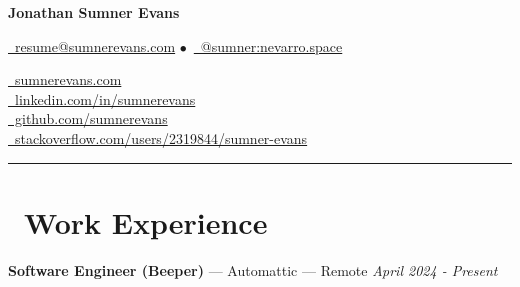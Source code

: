\documentclass[10pt,letterpaper]{article}
\begin{document}
\begin{minipage}[b][][b]{0.5\linewidth}
    {\huge\textbf{Jonathan Sumner Evans}}

    \vspace{5pt}
    \href{mailto:resume@sumnerevans.com}{\faEnvelope\ resume@sumnerevans.com}
    $\bullet$\ \href{https://matrix.to/#/@sumner:nevarro.space}{\faMatrixOrg\ @sumner:nevarro.space}
\end{minipage}\hfill
\begin{minipage}[b][][b]{0.4375\linewidth}
    \href{https://sumnerevans.com}{\faGlobe\ sumnerevans.com} \\
    \href{https://www.linkedin.com/in/sumnerevans}{\faLinkedin\ linkedin.com/in/sumnerevans} \\
    \href{https://github.com/sumnerevans}{\faGithub\ github.com/sumnerevans} \\
    \href{https://stackoverflow.com/users/2319844/sumner-evans}{\faStackOverflow\ stackoverflow.com/users/2319844/sumner-evans}
\end{minipage}
\rule{\textwidth}{0.5pt}

\section*{\faBriefcase\ Work Experience}
{\fontsize{11}{0}
\textbf{Software Engineer (Beeper)} --- Automattic --- Remote}
\hfill \textit{April 2024 - Present}

\vspace{5pt}
\end{document}
